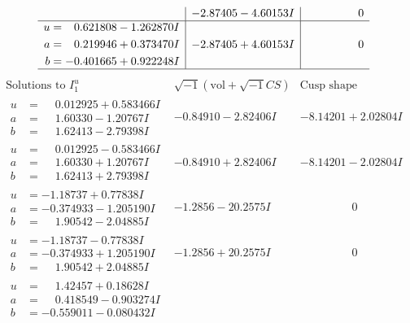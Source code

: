 \documentclass[1p]{elsarticle_modified}
\theoremstyle{definition}
\newcommand{\I}{\sqrt{-1}}
\begin{document}
$$\begin{array}{c|c|c}
 & -2.87405 - 4.60153 I & \phantom{-0.000000 } 0 \\ \hline\begin{aligned}
u &= \phantom{-}0.621808 - 1.262870 I \\
a &= \phantom{-}0.219946 + 0.373470 I \\
b &= -0.401665 + 0.922248 I\end{aligned}
 & -2.87405 + 4.60153 I & \phantom{-0.000000 } 0\\
 \hline 
 \end{array}$$\newpage$$\begin{array}{c|c|c}  
\text{Solutions to }I^u_{1}& \I (\text{vol} + \sqrt{-1}CS) & \text{Cusp shape}\\
 \hline 
\begin{aligned}
u &= \phantom{-}0.012925 + 0.583466 I \\
a &= \phantom{-}1.60330 - 1.20767 I \\
b &= \phantom{-}1.62413 - 2.79398 I\end{aligned}
 & -0.84910 - 2.82406 I & -8.14201 + 2.02804 I \\ \hline\begin{aligned}
u &= \phantom{-}0.012925 - 0.583466 I \\
a &= \phantom{-}1.60330 + 1.20767 I \\
b &= \phantom{-}1.62413 + 2.79398 I\end{aligned}
 & -0.84910 + 2.82406 I & -8.14201 - 2.02804 I \\ \hline\begin{aligned}
u &= -1.18737 + 0.77838 I \\
a &= -0.374933 - 1.205190 I \\
b &= \phantom{-}1.90542 - 2.04885 I\end{aligned}
 & -1.2856 - 20.2575 I & \phantom{-0.000000 } 0 \\ \hline\begin{aligned}
u &= -1.18737 - 0.77838 I \\
a &= -0.374933 + 1.205190 I \\
b &= \phantom{-}1.90542 + 2.04885 I\end{aligned}
 & -1.2856 + 20.2575 I & \phantom{-0.000000 } 0 \\ \hline\begin{aligned}
u &= \phantom{-}1.42457 + 0.18628 I \\
a &= \phantom{-}0.418549 - 0.903274 I \\
b &= -0.559011 - 0.080432 I\end{aligned}

\end{array}$$
\end{document}
